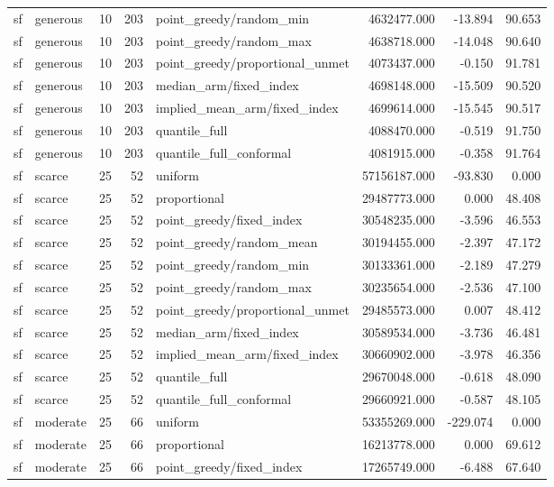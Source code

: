 \begin{tabular}{llrrlrrr}
sf & generous & 10 & 203 & point\_greedy/random\_min & 4632477.000 & -13.894 & 90.653 \\
sf & generous & 10 & 203 & point\_greedy/random\_max & 4638718.000 & -14.048 & 90.640 \\
sf & generous & 10 & 203 & point\_greedy/proportional\_unmet & 4073437.000 & -0.150 & 91.781 \\
sf & generous & 10 & 203 & median\_arm/fixed\_index & 4698148.000 & -15.509 & 90.520 \\
sf & generous & 10 & 203 & implied\_mean\_arm/fixed\_index & 4699614.000 & -15.545 & 90.517 \\
sf & generous & 10 & 203 & quantile\_full & 4088470.000 & -0.519 & 91.750 \\
sf & generous & 10 & 203 & quantile\_full\_conformal & 4081915.000 & -0.358 & 91.764 \\
sf & scarce & 25 & 52 & uniform & 57156187.000 & -93.830 & 0.000 \\
sf & scarce & 25 & 52 & proportional & 29487773.000 & 0.000 & 48.408 \\
sf & scarce & 25 & 52 & point\_greedy/fixed\_index & 30548235.000 & -3.596 & 46.553 \\
sf & scarce & 25 & 52 & point\_greedy/random\_mean & 30194455.000 & -2.397 & 47.172 \\
sf & scarce & 25 & 52 & point\_greedy/random\_min & 30133361.000 & -2.189 & 47.279 \\
sf & scarce & 25 & 52 & point\_greedy/random\_max & 30235654.000 & -2.536 & 47.100 \\
sf & scarce & 25 & 52 & point\_greedy/proportional\_unmet & 29485573.000 & 0.007 & 48.412 \\
sf & scarce & 25 & 52 & median\_arm/fixed\_index & 30589534.000 & -3.736 & 46.481 \\
sf & scarce & 25 & 52 & implied\_mean\_arm/fixed\_index & 30660902.000 & -3.978 & 46.356 \\
sf & scarce & 25 & 52 & quantile\_full & 29670048.000 & -0.618 & 48.090 \\
sf & scarce & 25 & 52 & quantile\_full\_conformal & 29660921.000 & -0.587 & 48.105 \\
sf & moderate & 25 & 66 & uniform & 53355269.000 & -229.074 & 0.000 \\
sf & moderate & 25 & 66 & proportional & 16213778.000 & 0.000 & 69.612 \\
sf & moderate & 25 & 66 & point\_greedy/fixed\_index & 17265749.000 & -6.488 & 67.640 \\

\end{tabular}
